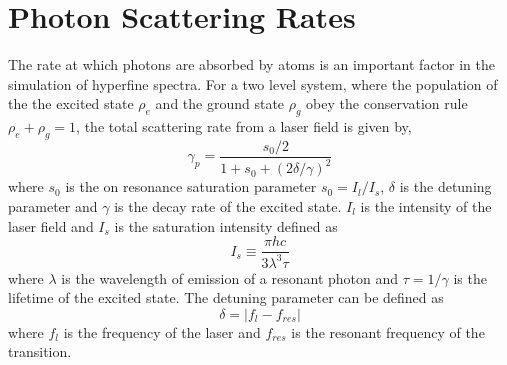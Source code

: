 \section{Photon Scattering Rates}
The rate at which photons are absorbed by atoms is an important factor in the simulation of hyperfine spectra. For a two level system, where the population of the the excited state $\rho_{e}$ and the ground state $\rho_{g}$ obey the conservation rule $\rho_e +\rho_g = 1$, the total scattering rate from a laser field is given by,
\begin{equation}
\gamma_p =  \frac{s_0/2}{1+s_0+(2\delta/\gamma)^2}
\label{scatt_rate}
\end{equation}
where $s_0$ is the on resonance saturation parameter $s_0 = I_l/I_s$, $\delta$ is the detuning parameter and $\gamma$ is the decay rate of the excited state. $I_l$ is the intensity of the laser field and $I_s$ is the saturation intensity defined as
\begin{equation}
I_s \equiv \frac{\pi h c}{3 \lambda^3 \tau}
\end{equation}
where $\lambda$ is the wavelength of emission of a resonant photon and $\tau = 1/\gamma$ is the lifetime of the excited state. The detuning parameter can be defined as
\begin{equation}
\delta =|f_{l} - f_{res}|
\end{equation}
where $f_l$ is the frequency of the laser and $f_{res}$ is the resonant frequency of the transition.

